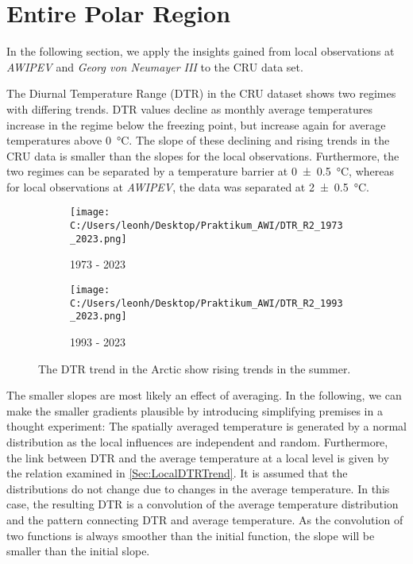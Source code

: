\section{Entire Polar Region}

In the following section, we apply the insights gained from local observations at \textit{AWIPEV} and \textit{Georg von Neumayer III} to the CRU data set.

The Diurnal Temperature Range (DTR) in the CRU dataset shows two regimes with differing trends. DTR values decline as monthly average temperatures increase in the regime below the freezing point, but increase again for average temperatures above \SI{0}{\celsius}. The slope of these declining and rising trends in the CRU data is smaller than the slopes for the local observations. Furthermore, the two regimes can be separated by a temperature barrier at \SI{0\pm0.5}{\celsius}, whereas for local observations at \textit{AWIPEV}, the data was separated at \SI{2\pm0.5}{\celsius}.

\begin{figure}[ht]
    \centering

    \begin{subfigure}[t]{0.45\textwidth}
        \centering
        \texttt{[image: C:/Users/leonh/Desktop/Praktikum\_AWI/DTR\_R2\_1973\_2023.png]}
        \caption{1973 - 2023}
    \end{subfigure}
    \hfil
    \begin{subfigure}[t]{0.45\textwidth}
        \centering
        \texttt{[image: C:/Users/leonh/Desktop/Praktikum\_AWI/DTR\_R2\_1993\_2023.png]}
        \caption{1993 - 2023}
    \end{subfigure}

    \caption{The DTR trend in the Arctic show rising trends in the summer.}
    \label{fig:2by2subfigures}
  \end{figure}

The smaller slopes are most likely an effect of averaging. In the following, we can make the smaller gradients plausible by introducing simplifying premises in a thought experiment: The spatially averaged temperature is generated by a normal distribution as the local influences are independent and random. Furthermore, the link between DTR and the average temperature at a local level is given by the relation examined in \cref{Sec:LocalDTRTrend}. It is assumed that the distributions do not change due to changes in the average temperature. In this case, the resulting DTR is a convolution of the average temperature distribution and the pattern connecting DTR and average temperature. As the convolution of two functions is always smoother than the initial function, the slope will be smaller than the initial slope.

